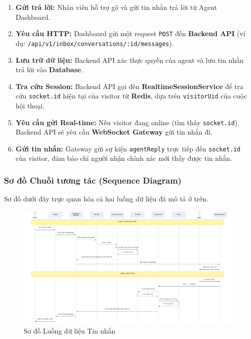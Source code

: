 \begin{enumerate}
    \item \textbf{Gửi trả lời:} Nhân viên hỗ trợ gõ và gửi tin nhắn trả lời từ Agent Dashboard.
    \item \textbf{Yêu cầu HTTP:} Dashboard gửi một request \texttt{POST} đến \textbf{Backend API} (ví dụ: \texttt{/api/v1/inbox/conversations/:id/messages}).
    \item \textbf{Lưu trữ dữ liệu:} Backend API xác thực quyền của agent và lưu tin nhắn trả lời vào \textbf{Database}.
    \item \textbf{Tra cứu Session:} Backend API gọi đến \textbf{RealtimeSessionService} để tra cứu \texttt{socket.id} hiện tại của visitor từ \textbf{Redis}, dựa trên \texttt{visitorUid} của cuộc hội thoại.
    \item \textbf{Yêu cầu gửi Real-time:} Nếu visitor đang online (tìm thấy \texttt{socket.id}), Backend API sẽ yêu cầu \textbf{WebSocket Gateway} gửi tin nhắn đi.
    \item \textbf{Gửi tin nhắn:} Gateway gửi sự kiện \texttt{agentReply} trực tiếp đến \texttt{socket.id} của visitor, đảm bảo chỉ người nhận chính xác mới thấy được tin nhắn.
\end{enumerate}

\subsubsection{Sơ đồ Chuỗi tương tác (Sequence Diagram)}

Sơ đồ dưới đây trực quan hóa cả hai luồng dữ liệu đã mô tả ở trên.

\begin{figure}[h!]
    \centering
    \caption{Sơ đồ Luồng dữ liệu Tin nhắn}
    \label{fig:sequence-diagram}
    \includegraphics[width=1\textwidth]{images/inbox-diagram.png}
\end{figure}